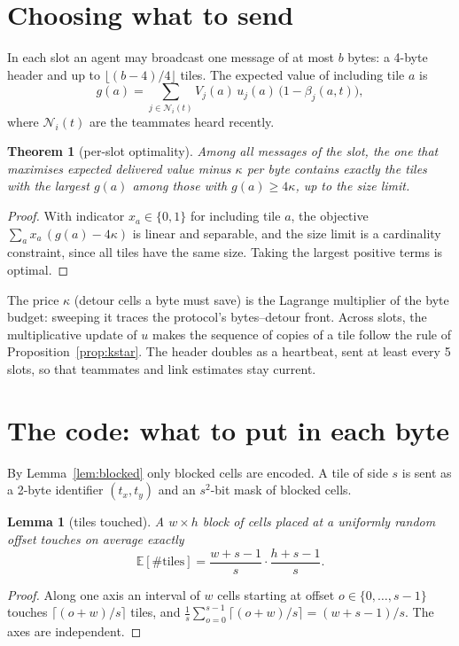 \documentclass[11pt,a4paper]{article}
\newtheorem{theorem}{Theorem}
\newtheorem{lemma}{Lemma}
\theoremstyle{definition}
\newcommand{\E}{\mathbb{E}}
\begin{document}
\section{Choosing what to send}\label{sec:select}

In each slot an agent may broadcast one message of at most $b$ bytes: a 4-byte header and up to $\lfloor(b-4)/4\rfloor$ tiles. The expected value of including tile $a$ is
\[
g(a)=\sum_{j\in\mathcal N_i(t)}V_j(a)\,u_j(a)\,\big(1-\beta_j(a,t)\big),
\]
where $\mathcal N_i(t)$ are the teammates heard recently.

\begin{theorem}[per-slot optimality]\label{thm:select}
Among all messages of the slot, the one that maximises expected delivered value minus $\kappa$ per byte contains exactly the tiles with the largest $g(a)$ among those with $g(a)\ge 4\kappa$, up to the size limit.
\end{theorem}
\begin{proof}
With indicator $x_a\in\{0,1\}$ for including tile $a$, the objective $\sum_a x_a\,(g(a)-4\kappa)$ is linear and separable, and the size limit is a cardinality constraint, since all tiles have the same size. Taking the largest positive terms is optimal.
\end{proof}
The price $\kappa$ (detour cells a byte must save) is the Lagrange multiplier of the byte budget: sweeping it traces the protocol's bytes--detour front. Across slots, the multiplicative update of $u$ makes the sequence of copies of a tile follow the rule of Proposition~\ref{prop:kstar}. The header doubles as a heartbeat, sent at least every 5 slots, so that teammates and link estimates stay current.

\section{The code: what to put in each byte}\label{sec:code}

By Lemma~\ref{lem:blocked} only blocked cells are encoded. A tile of side $s$ is sent as a 2-byte identifier $(t_x,t_y)$ and an $s^2$-bit mask of blocked cells.

\begin{lemma}[tiles touched]\label{lem:tiles}
A $w\times h$ block of cells placed at a uniformly random offset touches on average exactly
\[
\E[\#\text{tiles}]=\frac{w+s-1}{s}\cdot\frac{h+s-1}{s}.
\]
\end{lemma}
\begin{proof}
Along one axis an interval of $w$ cells starting at offset $o\in\{0,\dots,s-1\}$ touches $\lceil(o+w)/s\rceil$ tiles, and $\frac1s\sum_{o=0}^{s-1}\lceil(o+w)/s\rceil=(w+s-1)/s$. The axes are independent.
\end{proof}
\end{document}
